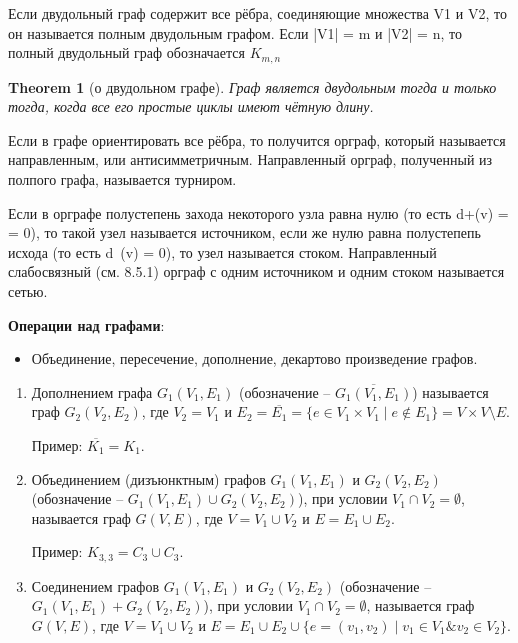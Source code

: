 \documentclass[
]{article}
\providecommand{\tightlist}{%
  \setlength{\itemsep}{0pt}\setlength{\parskip}{0pt}}
\newtheorem{theorem}{Theorem}
\begin{document}
\begin{enumerate}
{{{{{Если двудольный граф содержит
все рёбра, соединяющие множества V1 и V2, то он называется полным двудольным
графом. Если |V1| = m и |V2| = n, то полный двудольный граф обозначается $K_{m,n}$ 

\begin{theorem}[о двудольном графе]
  Граф является двудольным тогда и только тогда, когда все его простые
циклы имеют чётную длину.
\end{theorem}

Если в графе ориентировать все рёбра, то получится орграф, который называется
направленным, или антисимметричным. Направленный орграф, полученный из
полпого графа, называется турниром.

Если в орграфе полустепень захода некоторого узла равна нулю (то есть d+(v) =
= 0), то такой узел называется источником, если же нулю равна полустепепь
исхода (то есть d~(v) = 0), то узел называется стоком. Направленный слабосвязный (см. 8.5.1) орграф с одним источником и одним стоком называется
сетью.

\item
  \textbf{Операции над графами}:

  \begin{itemize}
  \tightlist
  \item
    Объединение, пересечение, дополнение, декартово произведение графов.
  \end{itemize}
\begin{enumerate}
    \item Дополнением графа $G_1(V_1, E_1)$ (обозначение -- $\overline{G_1(V_1, E_1)}$) называется граф $G_2(V_2, E_2)$, где $V_2 = V_1$ и $E_2 = \overline{E_1} = \{ e \in V_1 \times V_1 \mid e \notin E_1 \} = V \times V \setminus E$.
    
    Пример: $\overline{K_1} = K_1$.
    
    \item Объединением (дизъюнктным) графов $G_1(V_1, E_1)$ и $G_2(V_2, E_2)$ (обозначение -- $G_1(V_1, E_1) \cup G_2(V_2, E_2)$), при условии $V_1 \cap V_2 = \emptyset$, называется граф $G(V, E)$, где $V = V_1 \cup V_2$ и $E = E_1 \cup E_2$.
    
    Пример: $K_{3,3} = C_3 \cup C_3$.
    
    \item Соединением графов $G_1(V_1, E_1)$ и $G_2(V_2, E_2)$ (обозначение -- $G_1(V_1, E_1) + G_2(V_2, E_2)$), при условии $V_1 \cap V_2 = \emptyset$, называется граф $G(V, E)$, где $V = V_1 \cup V_2$ и $E = E_1 \cup E_2 \cup \{ e = (v_1, v_2) \mid v_1 \in V_1 \& v_2 \in V_2 \}$.
    

\end{enumerate}}}}}}
\end{enumerate}
\end{document}
